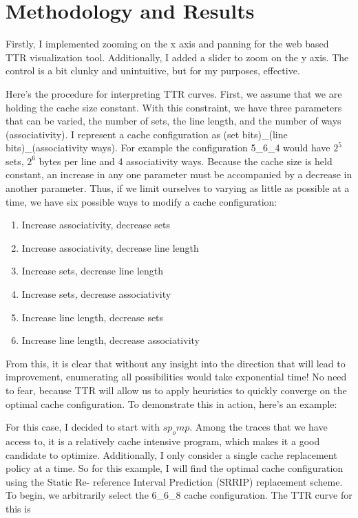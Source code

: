 
\section{Methodology and Results}
Firstly, I implemented zooming on the x axis and panning for the web based TTR visualization tool. Additionally, I added a slider to zoom on the y axis. The control is a bit clunky and unintuitive, but for my purposes, effective.

Here's the procedure for interpreting TTR curves. First, we assume that we are holding the cache size constant. With this constraint, we have three parameters that can be varied, the number of sets, the line length, and the number of ways (associativity). I represent a cache configuration as (set bits)\_(line bits)\_(associativity ways). For example the configuration 
5\_6\_4 
would have $2^5$ sets, $2^6$ bytes per line and 4 associativity ways. Because the cache size is held constant, an increase in any one parameter must be accompanied by a decrease in another parameter. Thus, if we limit ourselves to varying as little as possible at a time, we have six possible ways to modify a cache configuration:

\begin{enumerate}
\item Increase associativity, decrease sets
\item Increase associativity, decrease line length
\item Increase sets, decrease line length
\item Increase sets, decrease associativity
\item Increase line length, decrease sets
\item Increase line length, decrease associativity
\end{enumerate}

From this, it is clear that without any insight into the direction that will lead to improvement, enumerating all possibilities would take exponential time! No need to fear, because TTR will allow us to apply heuristics to quickly converge on the optimal cache configuration. To demonstrate this in action, here's an example:

For this case, I decided to start with $sp_omp$. Among the traces that we have access to, it is a relatively cache intensive program, which makes it a good candidate to optimize. Additionally, I only consider a single cache replacement policy at a time. So for this example, I will find the optimal cache configuration using the Static Re- reference Interval Prediction (SRRIP) replacement scheme. To begin, we arbitrarily select the 
6\_6\_8 
cache configuration. The TTR curve for this is

